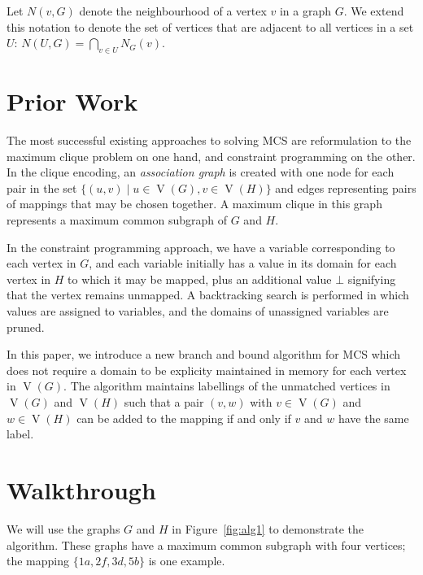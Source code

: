 \documentclass[letterpaper]{article}
\DeclareMathOperator{\V}{V}
\begin{document}
Let $N(v, G)$ denote the neighbourhood of a vertex $v$ in a graph $G$.  We
extend this notation to denote the set of vertices that are adjacent to all
vertices in a set $U$: $N(U, G) = \bigcap_{v \in U} N_G(v)$.

\section{Prior Work}

The most successful existing approaches to solving MCS are reformulation to the
maximum clique problem on one hand, and constraint programming
\cite{DBLP:conf/cp/McCreeshNPS16} on the other. In the clique
encoding, an \textit{association graph} is created with one node for each
pair in the set $\{(u,v) \mid u \in \V(G), v \in \V(H) \}$ and edges representing
pairs of mappings that may be chosen together. A maximum clique in this graph
represents a maximum common subgraph of $G$ and $H$.

In the constraint programming approach, we have a variable corresponding to each
vertex in $G$, and each variable initially has a value in its domain for each vertex
in $H$ to which it may be mapped, plus an additional value $\bot$ signifying that
the vertex remains unmapped. A backtracking search is performed in which values
are assigned to variables, and the domains of unassigned variables are pruned.

In this paper, we introduce a
new branch and bound algorithm for MCS which does not require a domain to be
explicity maintained in memory for each vertex in $\V(G)$. The algorithm
maintains labellings of the unmatched vertices in $\V(G)$ and $\V(H)$ such that
a pair $(v, w)$ with $v \in \V(G)$ and $w \in \V(H)$ can be added to the
mapping if and only if $v$ and $w$ have the same label.

\section{Walkthrough}

We will use the graphs $G$ and $H$ in Figure~\ref{fig:alg1} to demonstrate the
algorithm.  These graphs have a maximum common subgraph with four vertices; the
mapping $\{1a, 2f, 3d, 5b\}$ is one example.
\end{document}
